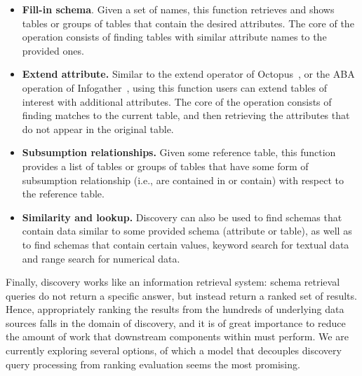 \begin{itemize}
\item \textbf{Fill-in schema}. Given a set of names, this function retrieves and
shows tables or groups of tables that contain the desired attributes. The core
of the operation consists of finding tables with similar attribute names to the
provided ones.

\item \textbf{Extend attribute.} Similar to the extend operator of
Octopus~\cite{octopus}, or the ABA operation of
Infogather~\cite{DBLP:conf/sigmod/YakoutGCC12}, using this function users can
extend tables of interest with additional attributes. The core of the operation
consists of finding matches to the current table, and then retrieving the
attributes that do not appear in the original table.

\item \textbf{Subsumption relationships.} Given some reference table, this
function provides a list of tables or groups of tables that have some form of
subsumption relationship (i.e., are contained in or contain) with respect to the
reference table. 

\item \textbf{Similarity and lookup.} Discovery can also be used to find schemas
that contain data similar to some provided schema (attribute or table), as well
as to find schemas that contain certain values, \ie keyword search for textual
data and range search for numerical data.  

\end{itemize}

Finally, discovery works like an information retrieval system: schema retrieval
queries do not return a specific answer, but instead return a ranked set of
results. Hence, appropriately ranking the results from the hundreds of
underlying data sources falls in the domain of discovery, and it is of great
importance to reduce the amount of work that downstream components within \dcv
must perform. We are currently exploring several options, of which a model that
decouples discovery query processing from ranking evaluation seems the most
promising.


